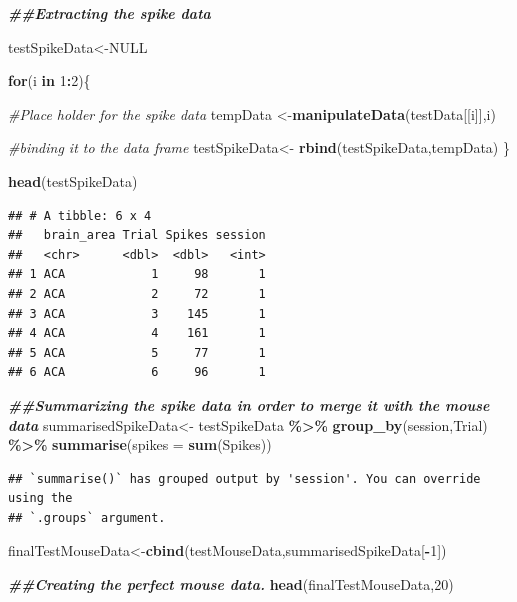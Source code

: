 \documentclass[
]{article}
\newenvironment{Shaded}{\begin{snugshade}}{\end{snugshade}}
\newcommand{\AttributeTok}[1]{\textcolor[rgb]{0.13,0.29,0.53}{#1}}
\newcommand{\CommentTok}[1]{\textcolor[rgb]{0.56,0.35,0.01}{\textit{#1}}}
\newcommand{\ConstantTok}[1]{\textcolor[rgb]{0.56,0.35,0.01}{#1}}
\newcommand{\ControlFlowTok}[1]{\textcolor[rgb]{0.13,0.29,0.53}{\textbf{#1}}}
\newcommand{\DecValTok}[1]{\textcolor[rgb]{0.00,0.00,0.81}{#1}}
\newcommand{\DocumentationTok}[1]{\textcolor[rgb]{0.56,0.35,0.01}{\textbf{\textit{#1}}}}
\newcommand{\FunctionTok}[1]{\textcolor[rgb]{0.13,0.29,0.53}{\textbf{#1}}}
\newcommand{\NormalTok}[1]{#1}
\newcommand{\OtherTok}[1]{\textcolor[rgb]{0.56,0.35,0.01}{#1}}
\newcommand{\SpecialCharTok}[1]{\textcolor[rgb]{0.81,0.36,0.00}{\textbf{#1}}}
\begin{document}
\begin{Shaded}
\begin{Highlighting}[]
\DocumentationTok{\#\#Extracting the spike data}

\NormalTok{testSpikeData}\OtherTok{\textless{}{-}}\ConstantTok{NULL}

\ControlFlowTok{for}\NormalTok{(i }\ControlFlowTok{in} \DecValTok{1}\SpecialCharTok{:}\DecValTok{2}\NormalTok{)\{}
  
  \CommentTok{\#Place holder for the spike data}
\NormalTok{  tempData }\OtherTok{\textless{}{-}}\FunctionTok{manipulateData}\NormalTok{(testData[[i]],i)}
  
  
  \CommentTok{\#binding it to the data frame}
\NormalTok{  testSpikeData}\OtherTok{\textless{}{-}} \FunctionTok{rbind}\NormalTok{(testSpikeData,tempData)}
\NormalTok{\}}

\FunctionTok{head}\NormalTok{(testSpikeData)}
\end{Highlighting}
\end{Shaded}

\begin{verbatim}
## # A tibble: 6 x 4
##   brain_area Trial Spikes session
##   <chr>      <dbl>  <dbl>   <int>
## 1 ACA            1     98       1
## 2 ACA            2     72       1
## 3 ACA            3    145       1
## 4 ACA            4    161       1
## 5 ACA            5     77       1
## 6 ACA            6     96       1
\end{verbatim}

\begin{Shaded}
\begin{Highlighting}[]
\DocumentationTok{\#\#Summarizing the spike data in order to merge it with the mouse data}
\NormalTok{summarisedSpikeData}\OtherTok{\textless{}{-}}\NormalTok{ testSpikeData }\SpecialCharTok{\%\textgreater{}\%}  \FunctionTok{group\_by}\NormalTok{(session,Trial) }\SpecialCharTok{\%\textgreater{}\%} \FunctionTok{summarise}\NormalTok{(}\AttributeTok{spikes =} \FunctionTok{sum}\NormalTok{(Spikes))}
\end{Highlighting}
\end{Shaded}

\begin{verbatim}
## `summarise()` has grouped output by 'session'. You can override using the
## `.groups` argument.
\end{verbatim}

\begin{Shaded}
\begin{Highlighting}[]
\NormalTok{finalTestMouseData}\OtherTok{\textless{}{-}}\FunctionTok{cbind}\NormalTok{(testMouseData,summarisedSpikeData[}\SpecialCharTok{{-}}\DecValTok{1}\NormalTok{])}

\DocumentationTok{\#\#Creating the perfect mouse data.}
\FunctionTok{head}\NormalTok{(finalTestMouseData,}\DecValTok{20}\NormalTok{)}
\end{Highlighting}
\end{Shaded}
\end{document}
